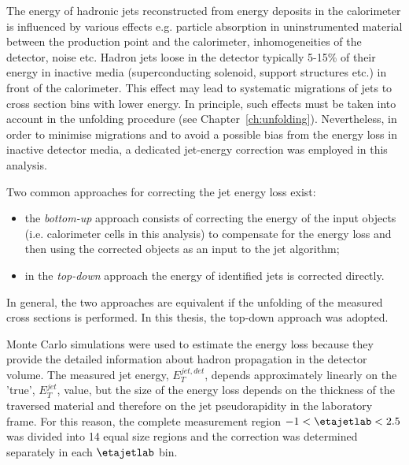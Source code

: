 The energy of hadronic jets reconstructed from energy deposits in the calorimeter is influenced by various effects e.g. particle absorption in uninstrumented material between the production point and the calorimeter, inhomogeneities of the detector, noise etc. Hadron jets loose in the \zeus detector typically 5-15\% of their energy in inactive media (superconducting solenoid, support structures etc.) in front of the calorimeter. This effect may lead to systematic migrations of jets to cross section bins with lower energy. In principle, such effects must be taken into account in the unfolding procedure (see Chapter~\ref{ch:unfolding}). Nevertheless, in order to minimise migrations and to avoid a possible bias from the energy loss in inactive detector media, a dedicated jet-energy correction was employed in this analysis.

Two common approaches for correcting the jet energy loss exist:
\begin{itemize}
 \item the \emph{bottom-up} approach consists of correcting the energy of the input objects (i.e. calorimeter cells in this analysis) to compensate for the energy loss and then using the corrected objects as an input to the jet algorithm;
 \item in the \emph{top-down} approach the energy of identified jets is corrected directly.
\end{itemize}
In general, the two approaches are equivalent if the unfolding of the measured cross sections is performed. In this thesis, the top-down approach was adopted.

Monte Carlo simulations were used to estimate the energy loss because they provide the detailed information about hadron propagation in the detector volume. The measured jet energy, $E_T^{jet,det}$, depends approximately linearly on the 'true', $E_T^{jet}$, value, but the size of the energy loss depends on the thickness of the traversed material and therefore on the jet pseudorapidity in the laboratory frame. For this reason, the complete measurement region $-1<\etajetlab<2.5$ was divided into 14 equal size regions and the correction was determined separately in each $\etajetlab$ bin.

